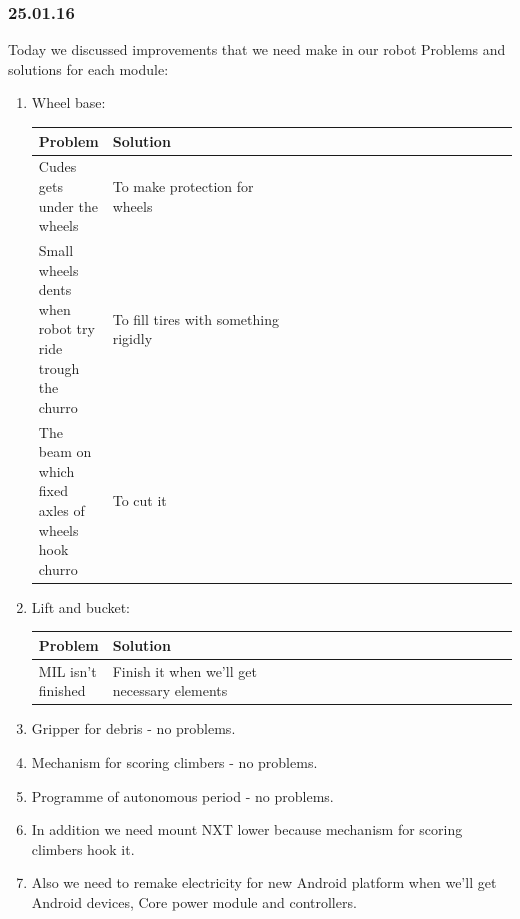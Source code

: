 \subsubsection{25.01.16}
Today we discussed improvements that we need make in our robot
Problems and solutions for each module:
	\begin{enumerate}
		\item Wheel base:
		\begin{table}[H]
			\vspace{-2mm}
			\begin{center}
				\begin{tabular}{|p{0.15\linewidth}|p{0.4\linewidth}|p{0.55\linewidth}}
					\hline
					Problem & Solution\\
					\hline
					Cudes gets under the wheels & To make protection for wheels \\
					\hline
					Small wheels dents when robot try ride trough the churro & To fill tires with something rigidly\\
					\hline
					The beam on which fixed axles of wheels hook churro & To cut it
				\end{tabular}
			\end{center}
		\end{table}
		\item Lift and bucket:
		\begin{table}[H]
			\vspace{-2mm}
			\begin{center}
				\begin{tabular}{|p{0.15\linewidth}|p{0.4\linewidth}|p{0.55\linewidth}}
					\hline
					Problem & Solution\\
					\hline
					MIL isn't finished  & Finish it when we'll get necessary elements\\	
					\hline
				\end{tabular}
			\end{center}
		\end{table}
		\item Gripper for debris - no problems.
		\item Mechanism for scoring climbers - no problems.
		\item Programme of autonomous period - no problems.
		
		\item In addition we need mount NXT lower because mechanism for scoring climbers hook it. 
		
		\item Also we need to remake electricity for new Android platform when we'll get Android devices, Core power module and controllers.
	\end{enumerate}
